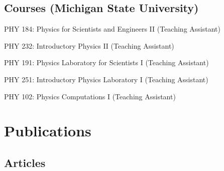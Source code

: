 \documentclass[12pt,letterpaper]{report}
\newcommand{\listitemspace}{0.25em}
\renewenvironment{itemize}
{\begin{list}{}{\setlength{\leftmargin}{0em}
            \setlength{\parskip}{0em}
            \setlength{\itemsep}{\listitemspace}
            \setlength{\parsep}{\listitemspace}}}
{\end{list}}
\begin{document}
\subsection*{Courses (Michigan State University)}

\begin{itemize}

        \item PHY 184: Physics for Scientists and Engineers II (Teaching Assistant)
        
        \item PHY 232: Introductory Physics II (Teaching Assistant)
        
        \item PHY 191: Physics Laboratory for Scientists I (Teaching Assistant)
        
        \item PHY 251: Introductory Physics Laboratory I (Teaching Assistant)
        
        \item PHY 102: Physics Computations I (Teaching Assistant)

\end{itemize}



\section*{Publications}

\subsection*{Articles}
\end{document}
